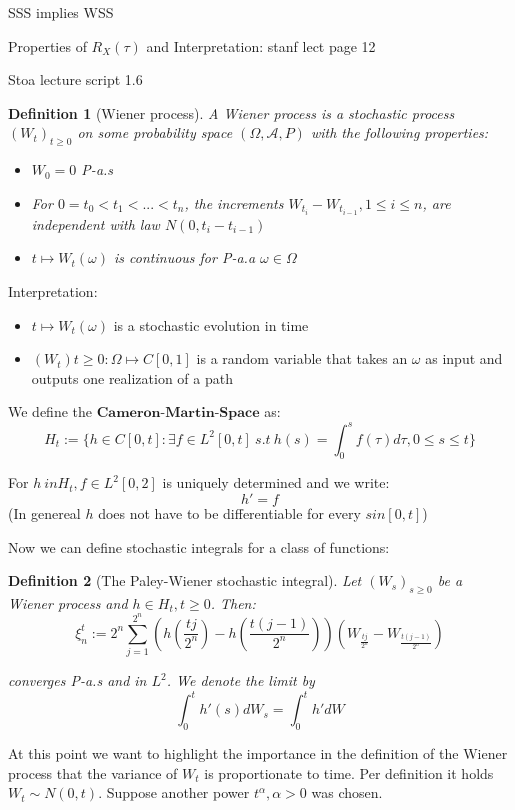 \documentclass[%
thesis=student,%
coverpage=false,%
titlepage=false,%
headmarks=true, %
german,%
font=libertine, %
math=newpxtx, %
BCOR=5mm,%
coverBCOR=11mm%
]{tumbook}
\newtheorem{definition}{Definition}[section]
\begin{document}
SSS implies WSS

Properties of $R_{X}(\tau)$ and Interpretation: stanf lect page 12

Stoa lecture script 1.6
\begin{definition}[Wiener process]
A Wiener process is a stochastic process $(W_{t})_{t\geq 0}$ on some probability space $(\Omega,\mathcal{A},P)$ with the following properties: 
\begin{itemize}
    \item $W_{0} = 0$ P-a.s
    \item For $0 = t_{0} < t_{1} < ... < t_{n}$, the increments $W_{t_{i}} - W_{t_{i-1}}, 1 \leq i \leq n$, are independent with law $N(0,t_{i}-t_{i-1})$
    \item $t \mapsto W_{t}(\omega)$ is continuous for P-a.a $\omega \in \Omega$
\end{itemize}
\end{definition}

Interpretation: 

\begin{itemize}
    \item $t \mapsto W_{t}(\omega)$ is a stochastic evolution in time
    \item $(W_{t}) t \geq 0: \Omega \mapsto C[0,1]$ is a random variable that takes an $\omega$ as input and outputs one realization of a path
\end{itemize}

We define the $\textbf{Cameron-Martin-Space}$ as:
\[
H_{t} := \{ h \in C[0,t]: \exists f \in L^{2}[0,t] \ s.t \  h(s) = \int_{0}^{s} f(\tau) d\tau, 0 \leq s \leq t \}
\]

For $h \ in H_{t}, f \in L^{2}[0,2]$ is uniquely determined and we write: 
\[
h' = f
\]
(In genereal $h$ does not have to be differentiable for every $s in [0,t]$)

Now we can define stochastic integrals for a class of functions:

\begin{definition}[The Paley-Wiener stochastic integral] 
Let $(W_{s})_{s\geq 0}$ be a Wiener process and $h \in H_{t}, t \geq 0$. Then:
\[
\xi_{n}^{t} := 2^{n}\sum_{j=1}^{2^{n}}(h(\frac{tj}{2^{n}})-h(\frac{t(j-1)}{2^{n}}))(W_{\frac{tj}{2^{n}}}-W_{\frac{t(j-1)}{2^{n}}}) 
\]

converges P-a.s and in $L^{2}$. We denote the limit by
\[
\int_{0}^{t}h'(s)dW_{s} = \int_{0}^{t}h'dW
\]
\end{definition}

At this point we want to highlight the importance in the definition of the Wiener process that the variance of $W_{t}$ is proportionate to time. Per definition it holds $W_{t} \sim N(0,t)$. Suppose another power $t^{\alpha}, \alpha > 0$ was chosen. 
\end{document}
